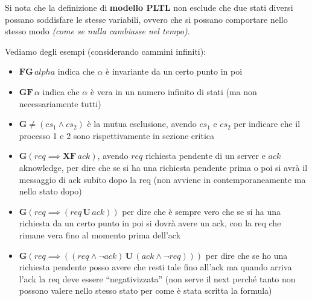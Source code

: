 \documentclass[a4paper,12pt, oneside]{book}
\begin{document}
Si nota che la definizione di \textbf{modello PLTL} non esclude che due stati
diversi possano soddisfare le stesse variabili, ovvero che si possano comportare
nello stesso modo \textit{(come se nulla cambiasse nel tempo)}.
\begin{esempio}
  Vediamo degli esempi (considerando cammini infiniti):
  \begin{itemize}
    \item $\mathbf{FG}\,alpha$ indica che $\alpha$ è invariante da un certo
    punto in poi
    \item $\mathbf{GF}\,\alpha$ indica che $\alpha$ è vera in un numero infinito
    di stati (ma non necessariamente tutti)
    \item $\mathbf{G}\neq (cs_1\land cs_2)$ è la mutua esclusione, avendo $cs_1$
    e $cs_2$ per indicare che il processo 1 e 2 sono rispettivamente in sezione
    critica 
    \item $\mathbf{G}(req\implies\mathbf{XF}\,ack)$, avendo $req$ richiesta
    pendente di un server e $ack$ aknowledge, per dire che se si ha una
    richiesta pendente prima o poi si avrà il messaggio di ack subito dopo la
    req (non avviene in contemporaneamente ma nello stato dopo)
    \item $\mathbf{G}(req\implies(req\,\mathbf{U}\,ack))$ per dire che è sempre
    vero che se si ha una richiesta da un certo punto in poi si dovrà avere un
    ack, con la req che rimane vera fino al momento prima dell'ack
    \item $\mathbf{G}(req\implies((req\land \neg ack)\,\mathbf{U}\,(ack\land\neg
    req)))$ per dire che se ho una richiesta pendente posso avere che resti tale
    fino all'ack ma quando arriva l'ack la req deve essere ``negativizzata''
    (non serve il next perché tanto non possono valere nello stesso stato per
    come è stata scritta la formula)
  \end{itemize}
\end{esempio}
\end{document}
